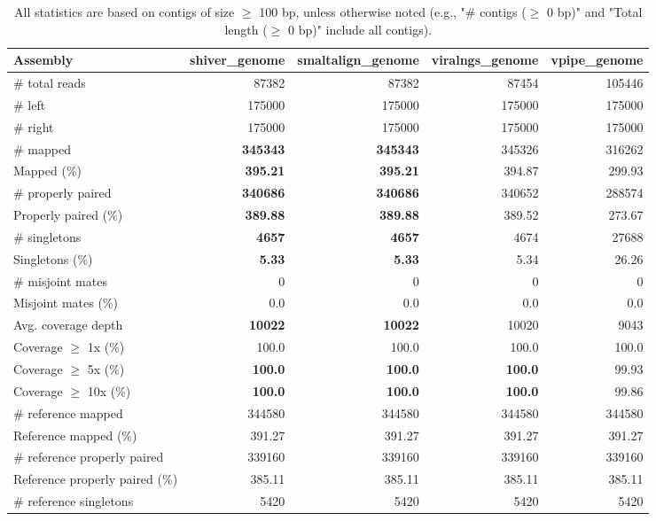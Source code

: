 \documentclass[12pt,a4paper]{article}
\begin{document}
\begin{table}[ht]
\begin{center}
\caption{All statistics are based on contigs of size $\geq$ 100 bp, unless otherwise noted (e.g., "\# contigs ($\geq$ 0 bp)" and "Total length ($\geq$ 0 bp)" include all contigs).}
\begin{tabular}{|l*{4}{|r}|}
\hline
Assembly & shiver\_genome & smaltalign\_genome & viralngs\_genome & vpipe\_genome \\ \hline
\# total reads & 87382 & 87382 & 87454 & 105446 \\ \hline
\# left & 175000 & 175000 & 175000 & 175000 \\ \hline
\# right & 175000 & 175000 & 175000 & 175000 \\ \hline
\# mapped & {\bf 345343} & {\bf 345343} & 345326 & 316262 \\ \hline
Mapped (\%) & {\bf 395.21} & {\bf 395.21} & 394.87 & 299.93 \\ \hline
\# properly paired & {\bf 340686} & {\bf 340686} & 340652 & 288574 \\ \hline
Properly paired (\%) & {\bf 389.88} & {\bf 389.88} & 389.52 & 273.67 \\ \hline
\# singletons & {\bf 4657} & {\bf 4657} & 4674 & 27688 \\ \hline
Singletons (\%) & {\bf 5.33} & {\bf 5.33} & 5.34 & 26.26 \\ \hline
\# misjoint mates & 0 & 0 & 0 & 0 \\ \hline
Misjoint mates (\%) & 0.0 & 0.0 & 0.0 & 0.0 \\ \hline
Avg. coverage depth & {\bf 10022} & {\bf 10022} & 10020 & 9043 \\ \hline
Coverage $\geq$ 1x (\%) & 100.0 & 100.0 & 100.0 & 100.0 \\ \hline
Coverage $\geq$ 5x (\%) & {\bf 100.0} & {\bf 100.0} & {\bf 100.0} & 99.93 \\ \hline
Coverage $\geq$ 10x (\%) & {\bf 100.0} & {\bf 100.0} & {\bf 100.0} & 99.86 \\ \hline
\# reference mapped & 344580 & 344580 & 344580 & 344580 \\ \hline
Reference mapped (\%) & 391.27 & 391.27 & 391.27 & 391.27 \\ \hline
\# reference properly paired & 339160 & 339160 & 339160 & 339160 \\ \hline
Reference properly paired (\%) & 385.11 & 385.11 & 385.11 & 385.11 \\ \hline
\# reference singletons & 5420 & 5420 & 5420 & 5420 \\ \hline

\end{tabular}
\end{center}
\end{table}
\end{document}
